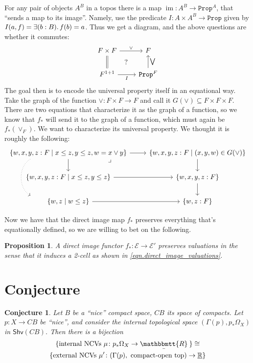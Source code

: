 \documentclass[11pt, oneside, article]{memoir}
\theoremstyle{plain}
\newtheorem{proposition}[theorem]{Proposition}
\newtheorem{conjecture}[theorem]{Conjecture}
\theoremstyle{definition}
\theoremstyle{remark}
\renewcommand{\ss}{\subseteq}
\DeclareMathOperator{\im}{im}
\newcommand{\const}[1]{\mathtt{#1}}
\newcommand{\cat}[1]{\mathcal{#1}}
\newcommand{\Fun}[1]{\mathsf{#1}}
\newcommand{\tn}[1]{\textnormal{#1}}
\newcommand{\ul}[1]{\underline{#1}}
\newcommand{\ubar}[1]{\underaccent{\bar}{#1}}
\newcommand{\internal}[1]{\raisebox{-.03ex}{$\mathbbmtt{#1}$}}
\newcommand{\hs}{\hspace{1.1pt}}
\newcommand{\LR}{\ul{\mathbb{R}}}
\newcommand{\tRR}{\internal{R}\hs}
\newcommand{\tLR}{\ubar{\tRR}\hs}
\newcommand{\Shv}{\Fun{Shv}}
\newcommand{\Prop}{\const{Prop}}
\begin{document}
For any pair of objects $A^B$ in a topos there is a map $\im\colon A^B\to\Prop^A$, that ``sends a map to its image''. Namely, use the predicate $I\colon A\times A^B\to\Prop$ given by $I(a,f)=\exists(b:B)\ldotp f(b)=a$. Thus we get a diagram, and the above questions are whether it commutes:
\[
\begin{tikzcd}
	F\times F\ar[d, equal]\ar[r, "\vee"]&F\\
	F^{1+1}\ar[r, "I"']&\Prop^F\ar[u, "\bigvee"']\ar[ul, phantom, "?"]
\end{tikzcd}
\]
The goal then is to encode the universal property itself in an equational way. Take the graph of the function $\vee\colon F\times F\to F$ and call it $G(\vee)\ss F\times F\times F$. There are two equations that characterize it as the graph of a function, so we know that $f_*$ will send it to the graph of a function, which must again be $f_*(\vee_F)$. We want to characterize its universal property. We thought it is roughly the following:
\[
\begin{tikzcd}
	\{w,x,y,z:F\mid x\leq z, y\leq z, w=x\vee y\}\ar[r]\ar[d]\ar[dd, shift right=40pt, bend right=60pt, dotted]
	&\{w,x,y,z:F\mid (x,y,w)\in G(\vee)\}\ar[d]\\
	\{w,x,y,z:F\mid x\leq z, y\leq z\}\ar[r]&\{w,x,y,z:F\}\ar[ul, phantom, very near end, "\lrcorner"]\ar[d]\\
	\{w,z\mid w\leq z\}\ar[r]&\{w,z:F\}
\end{tikzcd}
\]

Now we have that the direct image map $f_*$ preserves everything that's equationally defined, so we are willing to bet on the following.
\begin{proposition}
A direct image functor $f_*\colon\cat{E}\to\cat{E'}$ preserves valuations in the sense that it induces a 2-cell as shown in \cref{eqn.direct_image_valuations}.
\end{proposition}

\section{Conjecture}

\begin{conjecture}\label{conj.may8}
Let $B$ be a ``nice'' compact space, $CB$ its space of compacts. Let $p\colon X\to CB$ be ``nice'', and consider the internal topological space $(\Gamma(p),p_*\Omega_X)$ in $\Shv(CB)$. Then there is a bijection
\begin{multline*}
  \{\tn{internal NCVs } \mu\colon p_*\Omega_X\to\tLR\}
	\cong\\
	\{\tn{external NCVs } \mu'\colon(\Gamma(p),\tn{ compact-open top})\to\LR\}
\end{multline*}
\end{conjecture}
\end{document}

